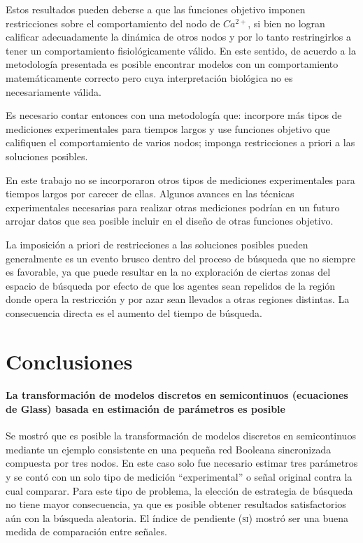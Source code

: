 Estos resultados pueden deberse a que las funciones objetivo imponen restricciones sobre el comportamiento del nodo de $Ca^{2+}$, si bien no logran calificar adecuadamente la dinámica de otros nodos y por lo tanto restringirlos a tener un comportamiento fisiológicamente válido. En este sentido, de acuerdo a la metodología presentada es posible encontrar modelos con un comportamiento matemáticamente correcto pero cuya interpretación biológica no es necesariamente válida. 

Es necesario contar entonces con una metodología que: incorpore más tipos de mediciones experimentales para tiempos largos y use funciones objetivo que califiquen el comportamiento de varios nodos; imponga restricciones a priori a las soluciones posibles. 

En este trabajo no se incorporaron otros tipos de mediciones experimentales para tiempos largos por carecer de ellas. Algunos avances en las técnicas experimentales necesarias para realizar otras mediciones podrían en un futuro arrojar datos que sea posible incluir en el diseño de otras funciones objetivo.

La imposición a priori de restricciones a las soluciones posibles pueden generalmente es un evento brusco dentro del proceso de búsqueda que no siempre es favorable, ya que puede resultar en la no exploración de ciertas zonas del espacio de búsqueda por efecto de que los agentes sean repelidos de la región donde opera la restricción y por azar sean llevados a otras regiones distintas. La consecuencia directa es el aumento del tiempo de búsqueda.


\section{Conclusiones}

\paragraph {La transformación de modelos discretos en semicontinuos (ecuaciones de Glass) basada en estimación de parámetros es posible}Se mostró que es posible la transformación de modelos discretos en semicontinuos mediante un ejemplo consistente en una pequeña red Booleana sincronizada compuesta por tres nodos. En este caso solo fue necesario estimar tres parámetros y se contó con un solo tipo de medición ``experimental'' o señal original contra la cual comparar. Para este tipo de problema, la elección de estrategia de búsqueda no tiene mayor consecuencia, ya que es posible obtener resultados satisfactorios aún con la búsqueda aleatoria. El índice de pendiente \textsc{(si)} mostró ser una buena medida de comparación entre señales.  

